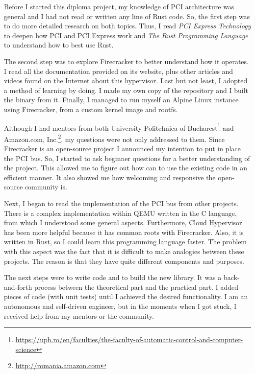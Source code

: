 \documentclass[12pt, a4paper]{report}
\begin{document}
Before I started this diploma project, my knowledge of PCI architecture was general and I had not read or written any line of Rust code. So, the first step was to do more detailed research on both topics. Thus, I read \textit{PCI Express Technology}\cite{book_pci_express} to deepen how PCI and PCI Express work and \textit{The Rust Programming Language}\cite{book_rust_programming} to understand how to best use Rust.

The second step was to explore Firecracker to better understand how it operates. I read all the documentation provided on its website, plus other articles and videos found on the Internet about this hypervisor. Last but not least, I adopted a method of learning by doing. I made my own copy of the repository and I built the binary from it. Finally, I managed to run myself an Alpine Linux instance using Firecracker, from a custom kernel image and rootfs.

Although I had mentors from both University Politehnica of Bucharest\footnote{\url{https://upb.ro/en/faculties/the-faculty-of-automatic-control-and-computer-science}} and
Amazon.com, Inc.\footnote{\url{http://romania.amazon.com}}, my questions were not only addressed to them. Since Firecracker is an open-source project I announced my intention to put in place the PCI bus. So, I started to ask beginner questions for a better understanding of the project. This allowed me to figure out how can to use the existing code in an efficient manner. It also showed me how welcoming and responsive the open-source community is.

Next, I began to read the implementation of the PCI bus from other projects. There is a complex implementation within QEMU written in the C language, from which I understood some general aspects. Furthermore, Cloud Hypervisor has been more helpful because it has common roots with Firecracker. Also, it is written in Rust, so I could learn this programming language faster. The problem with this aspect was the fact that it is difficult to make analogies between these projects. The reason is that they have quite different components and purposes.

The next steps were to write code and to build the new library. It was a back-and-forth process between the theoretical part and the practical part. I added pieces of code (with unit tests) until I achieved the desired functionality. I am an autonomous and self-driven engineer, but in the moments when I got stuck, I received help from my mentors or the community.
\end{document}
